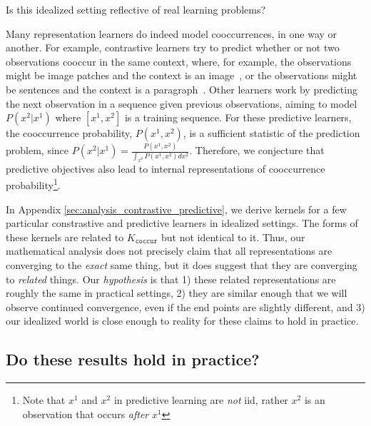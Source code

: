 

Is this idealized setting reflective of real learning problems? 

Many representation learners do indeed model cooccurrences, in one way or another. For example, contrastive learners try to predict whether or not two observations cooccur in the same context, where, for example, the observations might be image patches and the context is an image~\cite{SimCLR}, or the observations might be sentences and the context is a paragraph~\cite{SimSCE}. Other learners work by predicting the next observation in a sequence given previous observations, aiming to model $P(x^2 | x^1)$ where $[x^1, x^2]$ is a training sequence. For these predictive learners, the cooccurrence probability, $P(x^1, x^2)$, is a sufficient statistic of the prediction problem, since $P(x^2 | x^1) = \frac{P(x^1, x^2)}{\int_{x^2} P(x^1, x^2) dx^2}$. Therefore, we conjecture that predictive objectives also lead to internal representations of cooccurrence probability\footnote{Note that $x^1$ and $x^2$ in predictive learning are \textit{not} iid, rather $x^2$ is an observation that occurs \textit{after} $x^1$}.

In Appendix \ref{sec:analysis_contrastive_predictive}, we derive kernels for a few particular constrastive and predictive learners in idealized settings. The forms of these kernels are related to $K_{\texttt{coccur}}$ but not identical to it. Thus, our mathematical analysis does not precisely claim that all representations are converging to the \textit{exact} same thing, but it does suggest that they are converging to \textit{related} things. Our \textit{hypothesis} is that 1) these related representations are roughly the same in practical settings, 2) they are similar enough that we will observe continued convergence, even if the end points are slightly different, and 3) our idealized world is close enough to reality for these claims to hold in practice.


\subsection{Do these results hold in practice?}

